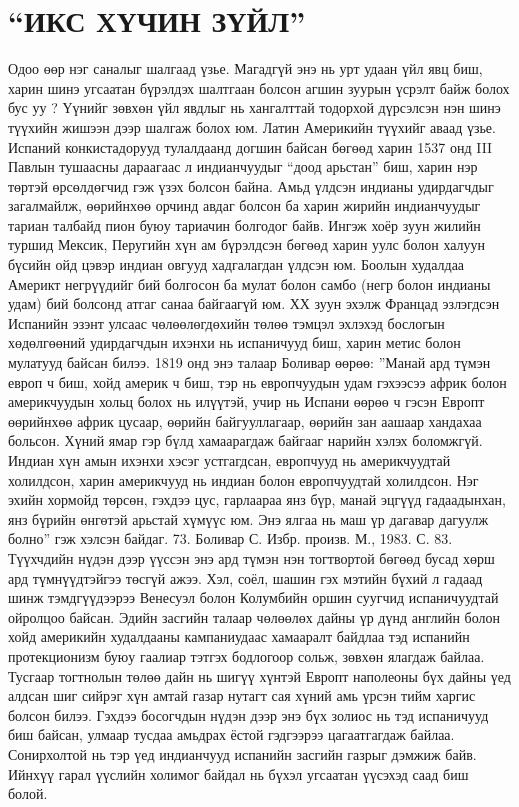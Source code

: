 \section{“ИКС ХҮЧИН ЗҮЙЛ”}
Одоо өөр нэг саналыг шалгаад үзье. Магадгүй энэ нь урт удаан үйл явц биш, харин шинэ угсаатан бүрэлдэх шалтгаан болсон агшин зуурын үсрэлт байж болох бус уу ? Үүнийг зөвхөн үйл явдлыг нь хангалттай тодорхой дүрсэлсэн нэн шинэ түүхийн жишээн дээр шалгаж болох юм. Латин Америкийн түүхийг аваад үзье. Испаний конкистадорууд тулалдаанд догшин байсан бөгөөд харин 1537 онд III Павлын тушаасны дараагаас л индианчуудыг “доод арьстан” биш, харин нэр төртэй өрсөлдөгчид гэж үзэх болсон байна. Амьд үлдсэн индианы удирдагчдыг загалмайлж, өөрийнхөө орчинд авдаг болсон ба харин жирийн индианчуудыг тариан талбайд пион буюу тариачин болгодог байв. Ингэж хоёр зуун жилийн туршид Мексик, Перугийн хүн ам бүрэлдсэн бөгөөд харин уулс болон халуун бүсийн ойд цэвэр индиан овгууд хадгалагдан үлдсэн юм. Боолын худалдаа Америкт негрүүдийг бий болгосон ба мулат болон самбо (негр болон индианы удам) бий болсонд атгаг санаа байгаагүй юм. ХХ зуун эхэлж Францад эзлэгдсэн Испанийн эзэнт улсаас чөлөөлөгдөхийн төлөө тэмцэл эхлэхэд бослогын хөдөлгөөний удирдагчдын ихэнхи нь испаничууд биш, харин метис болон мулатууд байсан билээ. 1819 онд энэ талаар Боливар өөрөө: ”Манай ард түмэн европ ч биш, хойд америк ч биш, тэр нь европчуудын удам гэхээсээ африк болон америкчуудын хольц болох нь илүүтэй, учир нь Испани өөрөө ч гэсэн Европт өөрийнхөө африк цусаар, өөрийн байгууллагаар, өөрийн зан аашаар хандахаа больсон. Хүний ямар гэр бүлд хамаарагдаж байгааг нарийн хэлэх боломжгүй. Индиан хүн амын ихэнхи хэсэг устгагдсан, европчууд нь америкчуудтай холилдсон, харин америкчууд нь индиан болон европчуудтай холилдсон. Нэг эхийн хормойд төрсөн, гэхдээ цус, гарлаараа янз бүр, манай эцгүүд гадаадынхан, янз бүрийн өнгөтэй арьстай хүмүүс юм. Энэ ялгаа нь маш үр дагавар дагуулж болно” гэж хэлсэн байдаг. 73. Боливар С. Избр. произв. М., 1983. С. 83.
Түүхчдийн нүдэн дээр үүссэн энэ ард түмэн нэн тогтвортой бөгөөд бусад хөрш ард түмнүүдтэйгээ төсгүй ажээ. Хэл, соёл, шашин гэх мэтийн бүхий л гадаад шинж тэмдгүүдээрээ Венесуэл болон Колумбийн оршин суугчид испаничуудтай ойролцоо байсан. Эдийн засгийн талаар чөлөөлөх дайны үр дүнд английн болон хойд америкийн худалдааны кампаниудаас хамааралт байдлаа тэд испанийн протекционизм буюу гаалиар тэтгэх бодлогоор сольж, зөвхөн ялагдаж байлаа. Тусгаар тогтнолын төлөө дайн нь шигүү хүнтэй Европт наполеоны бүх дайны үед алдсан шиг сийрэг хүн амтай газар нутагт сая хүний амь үрсэн тийм харгис болсон билээ. Гэхдээ босогчдын нүдэн дээр энэ бүх золиос нь тэд испаничууд биш байсан, улмаар тусдаа амьдрах ёстой гэдгээрээ цагаатгагдаж байлаа. Сонирхолтой нь тэр үед индианчууд испанийн засгийн газрыг дэмжиж байв. Ийнхүү гарал үүслийн холимог байдал нь бүхэл угсаатан үүсэхэд саад биш болой.
